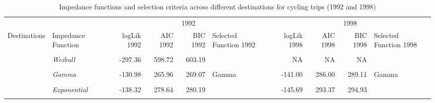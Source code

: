\documentclass[
11pt, %
oneside, %
english, %
singlespacing, %
]{macthesis} %
\begin{document}
\begin{landscape}\begin{table}[!h]
\centering
\caption{\label{tab:table-imc1}\label{tab:table_18}Impedance functions and selection criteria across different destinations for cycling trips (1992 and 1998)}
\centering
\fontsize{7}{9}\selectfont
\begin{tabular}[t]{>{}l|>{}lrrrlrrrl}
\toprule
\multicolumn{2}{c}{ } & \multicolumn{4}{c}{1992} & \multicolumn{4}{c}{1998} \\
\cmidrule(l{3pt}r{3pt}){3-6} \cmidrule(l{3pt}r{3pt}){7-10}
Destinations & Impedance
Function & logLik
1992 & AIC
1992 & BIC
1992 & Selected
Function
1992 & logLik
1998 & AIC
1998 & BIC
1998 & Selected
Function
1998\\
\midrule
\textbf{\cellcolor{gray!10}{}} & \em{\cellcolor{gray!10}{Gamma}} & \cellcolor{gray!10}{-296.80} & \cellcolor{gray!10}{597.61} & \cellcolor{gray!10}{602.07} & \cellcolor{gray!10}{Gamma} & \cellcolor{gray!10}{-250.55} & \cellcolor{gray!10}{505.09} & \cellcolor{gray!10}{509.38} & \cellcolor{gray!10}{Gamma}\\
\cmidrule{2-10}
\textbf{} & \em{Weibull} & -297.36 & 598.72 & 603.19 &  & NA & NA & NA & \\
\cmidrule{2-10}
\textbf{\cellcolor{gray!10}{\multirow[t]{-3}{*}{\raggedright\arraybackslash Home}}} & \em{\cellcolor{gray!10}{Exponential}} & \cellcolor{gray!10}{-299.38} & \cellcolor{gray!10}{600.77} & \cellcolor{gray!10}{603.00} & \cellcolor{gray!10}{} & \cellcolor{gray!10}{-253.36} & \cellcolor{gray!10}{508.72} & \cellcolor{gray!10}{510.86} & \cellcolor{gray!10}{}\\
\cmidrule{1-10}
\textbf{} & \em{Gamma} & -130.98 & 265.96 & 269.07 & Gamma & -141.00 & 286.00 & 289.11 & Gamma\\
\cmidrule{2-10}
\textbf{\cellcolor{gray!10}{}} & \em{\cellcolor{gray!10}{Weibull}} & \cellcolor{gray!10}{-131.06} & \cellcolor{gray!10}{266.11} & \cellcolor{gray!10}{269.22} & \cellcolor{gray!10}{} & \cellcolor{gray!10}{-141.71} & \cellcolor{gray!10}{287.42} & \cellcolor{gray!10}{290.53} & \cellcolor{gray!10}{}\\
\cmidrule{2-10}
\textbf{} & \em{Exponential} & -138.32 & 278.64 & 280.19 &  & -145.69 & 293.37 & 294.93 & \\
\cmidrule{2-10}
\textbf{\cellcolor{gray!10}{}} & \em{\cellcolor{gray!10}{Normal}} & \cellcolor{gray!10}{-134.55} & \cellcolor{gray!10}{273.10} & \cellcolor{gray!10}{276.21} & \cellcolor{gray!10}{} & \cellcolor{gray!10}{-148.73} & \cellcolor{gray!10}{301.45} & \cellcolor{gray!10}{304.56} & \cellcolor{gray!10}{}\\

\end{tabular}
\end{table}
\end{landscape}
\end{document}
